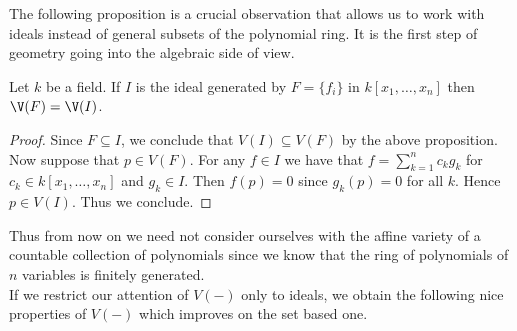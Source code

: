 \documentclass[a4paper]{article}
\begin{document}
The following proposition is a crucial observation that allows us to work with ideals instead of general subsets of the polynomial ring. It is the first step of geometry going into the algebraic side of view. 

\begin{prp}{}{} Let $k$ be a field. If $I$ is the ideal generated by $F=\{f_i\}$ in $k[x_1,\dots,x_n]$ then $\V(F)=\V(I)$. 
\begin{proof}
Since $F\subseteq I$, we conclude that $V(I)\subseteq V(F)$ by the above proposition. Now suppose that $p\in V(F)$. For any $f\in I$ we have that $f=\sum_{k=1}^nc_kg_k$ for $c_k\in k[x_1,\dots,x_n]$ and $g_k\in I$. Then $f(p)=0$ since $g_k(p)=0$ for all $k$. Hence $p\in V(I)$. Thus we conclude. 
\end{proof}
\end{prp}

Thus from now on we need not consider ourselves with the affine variety of a countable collection of polynomials since we know that the ring of polynomials of $n$ variables is finitely generated. \\

If we restrict our attention of $V(-)$ only to ideals, we obtain the following nice properties of $V(-)$ which improves on the set based one. 
\end{document}
